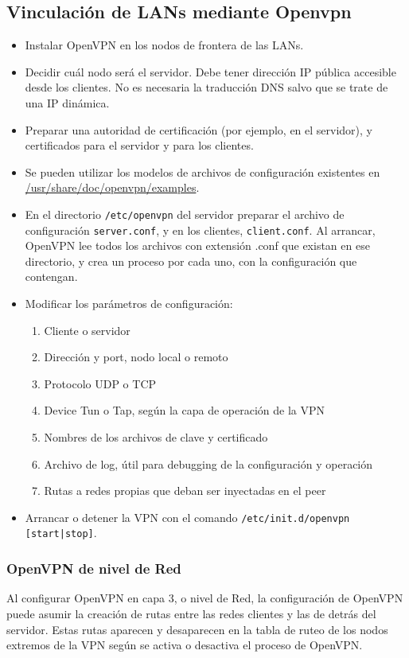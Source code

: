 \subsection{Vinculación de LANs mediante Openvpn}
\begin{itemize}
	\item Instalar OpenVPN en los nodos de frontera de las LANs.
	\item Decidir cuál nodo será el servidor. Debe tener dirección IP pública accesible desde los clientes. No es necesaria la traducción DNS salvo que se trate de una IP dinámica.
	\item Preparar una autoridad de certificación (por ejemplo, en el servidor), y certificados para el servidor y para los clientes.
	\item Se pueden utilizar los modelos de archivos de configuración existentes en \url{/usr/share/doc/openvpn/examples}.
	\item En el directorio \lstinline{/etc/openvpn} del servidor preparar el archivo de configuración \lstinline{server.conf}, y en los clientes, \lstinline{client.conf}. Al arrancar, OpenVPN lee todos los archivos con extensión .conf que existan en ese directorio, y crea un proceso por cada uno, con la configuración que contengan.
	\item Modificar los parámetros de configuración:
	\begin{enumerate}
		\item Cliente o servidor
		\item Dirección y port, nodo local o remoto
		\item Protocolo UDP o TCP
		\item Device Tun o Tap, según la capa de operación de la VPN  
		\item Nombres de los archivos de clave y certificado 
		\item Archivo de log, útil para debugging de la configuración y operación
		\item Rutas a redes propias que deban ser inyectadas en el peer
\end{enumerate} 
	\item Arrancar o detener la VPN con el comando \lstinline{/etc/init.d/openvpn [start|stop]}.
\end{itemize}

\subsubsection {OpenVPN de nivel de Red}
Al configurar OpenVPN en capa 3, o nivel de Red, la configuración de OpenVPN puede asumir la creación de rutas entre las redes clientes y las de detrás del servidor. Estas rutas aparecen y desaparecen en la tabla de ruteo de los nodos extremos de la VPN según se activa o desactiva el proceso de OpenVPN.

